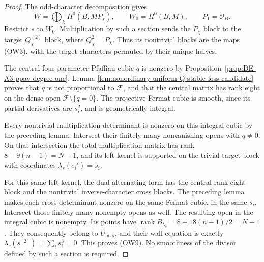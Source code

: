 \begin{proof}
The odd-character decomposition gives
\[
 W=\bigoplus_\chi H^0(B,MP_\chi),\qquad
 W_0=H^0(B,M),\qquad P_1=\mathcal O_B.
 \tag{OW10}
\]
Restrict \(s\) to \(W_0\).  Multiplication by such a section sends
the \(P_\chi\) block to the target \(Q_\chi^{(2)}\) block, where
\(Q_\chi^2=P_\chi\).  Thus its nontrivial blocks are the maps (OW3),
with the target characters permuted by their unique halves.

The central four-parameter Pfaffian cubic \(q\) is nonzero by
Proposition~\ref{prop:DE-A3-ppav-degree-one}.  Lemma
\ref{lem:nonordinary-uniform-Q-stable-loss-candidate} proves that
\(q\) is not proportional to \(\mathcal F\), and that the central
matrix has rank eight on the dense open \(\mathcal F\setminus\{q=0\}\).
The projective Fermat cubic is smooth, since its partial derivatives
are \(s_i^2\), and is geometrically integral.

Every nontrivial multiplication determinant is nonzero on this
integral cubic by the preceding lemma.  Intersect their finitely
many nonvanishing opens with \(q\ne0\).  On that intersection the
total multiplication matrix has rank \(8+9(n-1)=N-1\), and its
left kernel is supported on the trivial target block with coordinates
\(\lambda_s(e_i')=s_i\).

For this same left kernel, the dual alternating form has the central
rank-eight block and the nontrivial inverse-character cross blocks.
The preceding lemma makes each cross determinant nonzero on the same
Fermat cubic, in the same \(s_i\).  Intersect those finitely many
nonempty opens as well.  The resulting open in the integral cubic
is nonempty.  Its points have
\(\operatorname{rank}B_{\lambda_s}=8+18(n-1)/2=N-1\).
They consequently belong to \(U_{\max}\), and their wall equation is
exactly \(\lambda_s(s^{[2]})=\sum_i s_i^3=0\).  This proves (OW9).
No smoothness of the divisor defined by such a section is required.
\end{proof}

